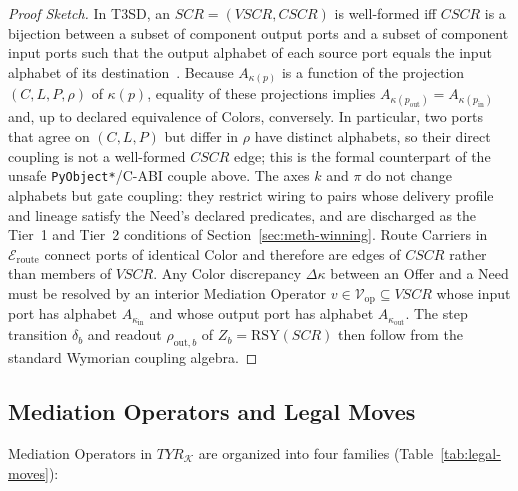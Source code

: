 \begin{proof}[Proof Sketch]
In T3SD, an $SCR = (VSCR, CSCR)$ is well-formed iff $CSCR$ is a bijection between a subset of component output ports and a subset of component input ports such that the output alphabet of each source port equals the input alphabet of its destination~\cite{Wymore1993}.  Because $A_{\kappa(p)}$ is a function of the projection $(C, L, P, \rho)$ of $\kappa(p)$, equality of these projections implies $A_{\kappa(p_{\text{out}})} = A_{\kappa(p_{\text{in}})}$ and, up to declared equivalence of Colors, conversely.  In particular, two ports that agree on $(C, L, P)$ but differ in $\rho$ have distinct alphabets, so their direct coupling is not a well-formed $CSCR$ edge; this is the formal counterpart of the unsafe \texttt{PyObject*}/C-ABI couple above.  The axes $k$ and $\pi$ do not change alphabets but gate coupling: they restrict wiring to pairs whose delivery profile and lineage satisfy the Need's declared predicates, and are discharged as the Tier~1 and Tier~2 conditions of Section~\ref{sec:meth-winning}.  Route Carriers in $\mathcal{E}_{\text{route}}$ connect ports of identical Color and therefore are edges of $CSCR$ rather than members of $VSCR$.  Any Color discrepancy $\Delta\kappa$ between an Offer and a Need must be resolved by an interior Mediation Operator $v \in \mathcal{V}_{\text{op}} \subseteq VSCR$ whose input port has alphabet $A_{\kappa_{\text{in}}}$ and whose output port has alphabet $A_{\kappa_{\text{out}}}$.  The step transition $\delta_b$ and readout $\rho_{\text{out},b}$ of $Z_b = \mathrm{RSY}(SCR)$ then follow from the standard Wymorian coupling algebra.
\end{proof}

\subsection{Mediation Operators and Legal Moves} \label{sec:meth-moves}

Mediation Operators in $TYR_{\mathcal{K}}$ are organized into four families (Table~\ref{tab:legal-moves}):

